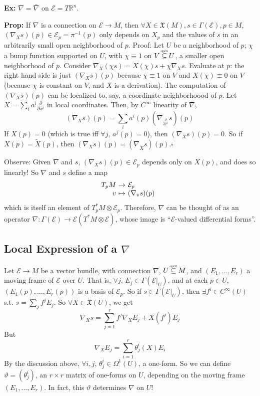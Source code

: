 \documentclass[10pt,letterpaper]{article}
\newcommand{\n}{\hfill\break}
\newcommand{\nn}{\vspace{0.5\baselineskip}\n}
\newcommand{\hangblock}[2]{\par\noindent\settowidth{\hangindent}{\textbf{#1: }}\textbf{#1: }\nolinebreak#2}
\newcommand{\prop}[1]{\hangblock{Prop}{#1}}
\newcommand{\ex}[1]{\hangblock{Ex}{#1}}
\newcommand{\proven}{\;$\square$\n}
\newcommand{\ptxt}[1]{\textrm{\textnormal{#1}}}
\newcommand{\reals}{\mathbb{R}}
\newcommand{\R}{\reals}
\newcommand{\osubseteq}{\overset{\mathclap{\scalebox{0.5}{\ptxt{open}}}}{\subseteq}}
\newcommand{\inv}{^{-1}}
\newcommand{\map}[4]{\!\!\!\begin{array}[t]{rcl}#1 & \!\!\!\!\to & \!\!\!\!#2\\ {}#3 & \!\!\!\!\mapsto & \!\!\!\!#4\end{array}}
\newcommand{\restr}[2]{\left.#1\right|_{#2}}
\newcommand{\pd}[2]{\frac{\partial{}#1}{\partial{}#2}}
\newcommand{\st}{s.t.}
\begin{document}
\ex{
	$\nabla=\bar\nabla$ on $\mathcal{E}=T\R^{n}$.\n
}

\prop{
	If $\nabla$ is a connection on $\mathcal{E}\to{}M$, then $\forall{}X\in\mathfrak{X}(M),s\in\Gamma(\mathcal{E}),p\in{}M$, $(\nabla_{X}s)(p)\in\mathcal{E}_{p}=\pi\inv(p)$ only depends on $X_{p}$ and the values of $s$ in an arbitrarily small open neighborhood of $p$.\nn
	Proof: Let $U$ be a neighborhood of $p$; $\chi$ a bump function supported on $U$, with $\chi\equiv{}1$ on $V\osubseteq{}U$, a smaller open neighborhood of $p$. Consider $\nabla_{X}(\chi{}s)=X(\chi)s+\chi\nabla_{X}s$. Evaluate at $p$: the right hand side is just $(\nabla_{X}s)(p)$ because $\chi\equiv{}1$ on $V$ and $X(\chi)\equiv{}0$ on $V$ (because $\chi$ is constant on $V$, and $X$ is a derivation). The computation of $(\nabla_{X}s)(p)$ can be localized to, say, a coordinate neighborhoood of $p$.\nn
	Let $X=\sum_{i}a^{i}\pd{}{x^{i}}$ in local coordinates. Then, by $C^{\infty}$ linearity of $\nabla$,
	\[
		(\nabla_{X}s)(p)=\sum_{i}a^{i}(p)(\nabla_{\pd{}{x^{i}}}s)(p)
	\]
	If $X(p)=0$ (which is true iff $\forall{}j$, $a^{j}(p)=0$), then $(\nabla_{X}s)(p)=0$. So if $X(p)=\tilde{X}(p)$, then $(\nabla_{X}s)(p)=(\nabla_{\tilde{X}}s)(p)$.\proven
}

\par\noindent
Observe: Given $\nabla$ and $s$, $(\nabla_{X}s)(p)\in\mathcal{E}_{p}$ depends only on $X(p)$, and does so linearly! So $\nabla$ and $s$ define a map
\[
	\map{T_{p}M}{\mathcal{E}_{p}}{v}{(\nabla_{v}s)(p)}
\]
which is itself an element of $T_{p}^{*}M\otimes\mathcal{E}_{p}$. Therefore, $\nabla$ can be thought of as an operator $\nabla:\Gamma(\mathcal{E})\to\mathcal{E}(T^{*}M\otimes\mathcal{E})$, whose image is ``$\mathcal{E}$-valued differential forms''.\n

\subsection*{Local Expression of a $\nabla$}

\par\noindent
Let $\mathcal{E}\to{}M$ be a vector bundle, with connection $\nabla$, $U\osubseteq{}M$, and $(E_{1},\ldots,E_{r})$ a moving frame of $\mathcal{E}$ over $U$. That is, $\forall{}j$, $E_{j}\in\Gamma(\restr{\mathcal{E}}{U})$, and at each $p\in{}U$, $(E_{1}(p),\ldots,E_{r}(p))$ is a basis of $\mathcal{E}_{p}$. So if $s\in\Gamma(\restr{\mathcal{E}}{U})$, then $\exists{}f^{i}\in{}C^{\infty}(U)$ \st{} $s=\sum_{j}f^{j}E_{j}$. So $\forall{}X\in\mathfrak{X}(U)$, we get
\[
	\nabla_{X}s=\sum_{j=1}^{r}f^{j}\nabla_{X}E_{j}+X(f^{j})E_{j}
\]
But
\[
	\nabla_{X}E_{j}=\sum_{i=1}^{r}\theta_{j}^{i}(X)E_{i}
\]
By the discussion above, $\forall{}i,j$, $\theta_{j}^{i}\in\Omega^{1}(U)$, a one-form. So we can define $\vartheta=(\theta_{j}^{i})$, an $r\times{}r$ matrix of one-forms on $U$, depending on the moving frame $(E_{1},\ldots,E_{r})$. In fact, this $\vartheta$ determines $\nabla$ on $U$!
\end{document}
